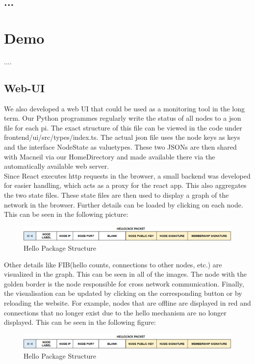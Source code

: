 \documentclass{article}
\begin{document}
	\subsection{...}
	\section{Demo}
	....
	\subsection{Web-UI}
	We also developed a web UI that could be used as a monitoring tool in the long term. Our Python programmes regularly write the status of all nodes to a json file for each pi. The exact structure of this file can be viewed in the code under frontend/ui/src/types/index.ts. The actual json file uses the node keys as keys and the interface NodeState as valuetypes. These two JSONs are then shared with Macneil via our HomeDirectory and made available there via the automatically available web server.\\
	Since React executes http requests in the browser, a small backend was developed for easier handling, which acts as a proxy for the react app. This also aggregates the two state files. These state files are then used to display a graph of the network in the browser. Further details can be loaded by clicking on each node. This can be seen in the following picture:\\
	\begin{figure}[H]
		\centering
		\includegraphics[scale=0.4]{media/hello_ack_package.png}
		\caption{Hello Package Structure}
		\label{fig:hello_ack_package}
	\end{figure}
	Other details like FIB(hello counts, connections to other nodes, etc.) are visualized in the graph. This can be seen in all of the images. The node with the golden border is the node responsible for cross network communication. Finally, the visualisation can be updated by clicking on the corresponding button or by reloading the website. For example, nodes that are offline are displayed in red and connections that no longer exist due to the hello mechanism are no longer displayed. This can be seen in the following figure:
	\begin{figure}[H]
		\centering
		\includegraphics[scale=0.4]{media/hello_ack_package.png}
		\caption{Hello Package Structure}
		\label{fig:hello_ack_package}
	\end{figure}
\end{document}
